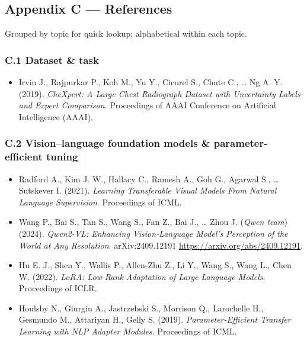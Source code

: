 \documentclass[
  11pt,
]{article}
\providecommand{\tightlist}{%
  \setlength{\itemsep}{0pt}\setlength{\parskip}{0pt}}
\begin{document}
\subsection{Appendix C --- References}\label{appendix-c-references}

Grouped by topic for quick lookup; alphabetical within each topic.

\subsubsection{C.1 Dataset \& task}\label{c.1-dataset-task}

\begin{itemize}
\tightlist
\item
  Irvin J., Rajpurkar P., Koh M., Yu Y., Cicurel S., Chute C., \ldots{}
  Ng A. Y. (2019). \emph{CheXpert: A Large Chest Radiograph Dataset with
  Uncertainty Labels and Expert Comparison}. Proceedings of AAAI
  Conference on Artificial Intelligence (AAAI).
\end{itemize}

\subsubsection{C.2 Vision--language foundation models \&
parameter-efficient
tuning}\label{c.2-visionlanguage-foundation-models-parameter-efficient-tuning}

\begin{itemize}
\item
  Radford A., Kim J. W., Hallacy C., Ramesh A., Goh G., Agarwal S.,
  \ldots{} Sutskever I. (2021). \emph{Learning Transferable Visual
  Models From Natural Language Supervision}. Proceedings of ICML.
\item
  Wang P., Bai S., Tan S., Wang S., Fan Z., Bai J., \ldots{} Zhou J.
  (\emph{Qwen team}) (2024). \emph{Qwen2-VL: Enhancing Vision-Language
  Model's Perception of the World at Any Resolution}. arXiv:2409.12191
  \url{https://arxiv.org/abs/2409.12191}.
\item
  Hu E. J., Shen Y., Wallis P., Allen-Zhu Z., Li Y., Wang S., Wang L.,
  Chen W. (2022). \emph{LoRA: Low-Rank Adaptation of Large Language
  Models}. Proceedings of ICLR.
\item
  Houlsby N., Giurgiu A., Jastrzebski S., Morrison Q., Larochelle H.,
  Gesmundo M., Attariyan H., Gelly S. (2019). \emph{Parameter-Efficient
  Transfer Learning with NLP Adapter Modules}. Proceedings of ICML.
\end{itemize}
\end{document}
